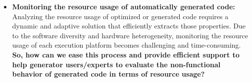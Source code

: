 \begin{itemize}
	\item \textbf{Monitoring the resource usage of automatically generated code:} 
	Analyzing the resource usage of optimized or generated code requires a dynamic and adaptive solution that efficiently extracts those properties. Due to the software diversity and hardware heterogeneity, monitoring the resource usage of each execution platform becomes challenging and time-consuming. 	
	\textbf{So, how can we ease this process and provide efficient support to help generator users/experts to evaluate the non-functional behavior of generated code in terms of resource usage?}
	

	

\end{itemize}


%
